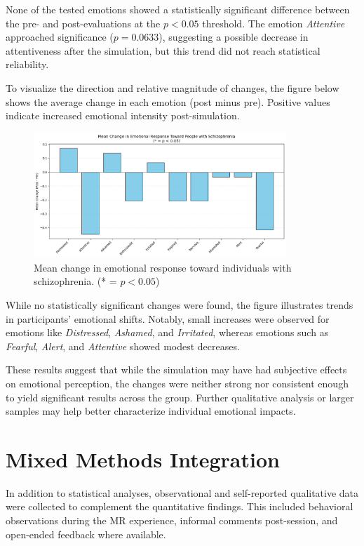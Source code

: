 None of the tested emotions showed a statistically significant difference between the pre- and post-evaluations at the $p < 0.05$ threshold. The emotion \textit{Attentive} approached significance ($p = 0.0633$), suggesting a possible decrease in attentiveness after the simulation, but this trend did not reach statistical reliability.

To visualize the direction and relative magnitude of changes, the figure below shows the average change in each emotion (post minus pre). Positive values indicate increased emotional intensity post-simulation.


\begin{figure}[H]
    \centering
    \includegraphics[width=0.85\textwidth]{../../Figures/mean-change-emotions.png}
    \caption{Mean change in emotional response toward individuals with schizophrenia. (* = $p < 0.05$)}
    \label{fig:emotion_change}
\end{figure}

While no statistically significant changes were found, the figure illustrates trends in participants’ emotional shifts. Notably, small increases were observed for emotions like \textit{Distressed}, \textit{Ashamed}, and \textit{Irritated}, whereas emotions such as \textit{Fearful}, \textit{Alert}, and \textit{Attentive} showed modest decreases.

These results suggest that while the simulation may have had subjective effects on emotional perception, the changes were neither strong nor consistent enough to yield significant results across the group. Further qualitative analysis or larger samples may help better characterize individual emotional impacts.


\section{Mixed Methods Integration}
In addition to statistical analyses, observational and self-reported qualitative data were collected to complement the quantitative findings. This included behavioral observations during the MR experience, informal comments post-session, and open-ended feedback where available.

